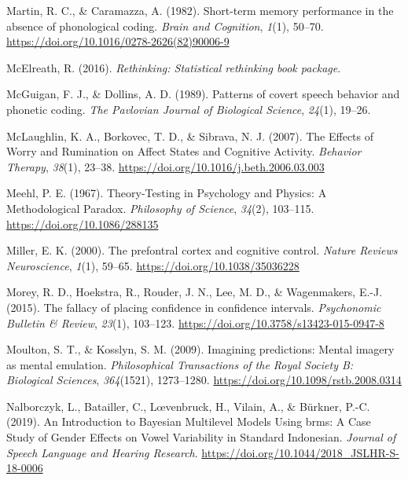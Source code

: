 \documentclass[a4paper,12pt,twoside,openright,oldfontcommands]{memoir}
\begin{document}
\hypertarget{ref-martin_short-term_1982}{}
Martin, R. C., \& Caramazza, A. (1982). Short-term memory performance in
the absence of phonological coding. \emph{Brain and Cognition},
\emph{1}(1), 50--70. \url{https://doi.org/10.1016/0278-2626(82)90006-9}

\hypertarget{ref-R-rethinking}{}
McElreath, R. (2016). \emph{Rethinking: Statistical rethinking book
package}.

\hypertarget{ref-mcguigan_patterns_1989}{}
McGuigan, F. J., \& Dollins, A. D. (1989). Patterns of covert speech
behavior and phonetic coding. \emph{The Pavlovian Journal of Biological
Science}, \emph{24}(1), 19--26.

\hypertarget{ref-mclaughlin_effects_2007}{}
McLaughlin, K. A., Borkovec, T. D., \& Sibrava, N. J. (2007). The
Effects of Worry and Rumination on Affect States and Cognitive Activity.
\emph{Behavior Therapy}, \emph{38}(1), 23--38.
\url{https://doi.org/10.1016/j.beth.2006.03.003}

\hypertarget{ref-meehl_theory-testing_1967}{}
Meehl, P. E. (1967). Theory-Testing in Psychology and Physics: A
Methodological Paradox. \emph{Philosophy of Science}, \emph{34}(2),
103--115. \url{https://doi.org/10.1086/288135}

\hypertarget{ref-miller_prefontral_2000}{}
Miller, E. K. (2000). The prefontral cortex and cognitive control.
\emph{Nature Reviews Neuroscience}, \emph{1}(1), 59--65.
\url{https://doi.org/10.1038/35036228}

\hypertarget{ref-morey_fallacy_2015}{}
Morey, R. D., Hoekstra, R., Rouder, J. N., Lee, M. D., \& Wagenmakers,
E.-J. (2015). The fallacy of placing confidence in confidence intervals.
\emph{Psychonomic Bulletin \& Review}, \emph{23}(1), 103--123.
\url{https://doi.org/10.3758/s13423-015-0947-8}

\hypertarget{ref-moulton_imagining_2009}{}
Moulton, S. T., \& Kosslyn, S. M. (2009). Imagining predictions: Mental
imagery as mental emulation. \emph{Philosophical Transactions of the
Royal Society B: Biological Sciences}, \emph{364}(1521), 1273--1280.
\url{https://doi.org/10.1098/rstb.2008.0314}

\hypertarget{ref-nalborczyk_introduction_2019}{}
Nalborczyk, L., Batailler, C., Lœvenbruck, H., Vilain, A., \& Bürkner,
P.-C. (2019). An Introduction to Bayesian Multilevel Models Using brms:
A Case Study of Gender Effects on Vowel Variability in Standard
Indonesian. \emph{Journal of Speech Language and Hearing Research}.
\url{https://doi.org/10.1044/2018_JSLHR-S-18-0006}
\end{document}
